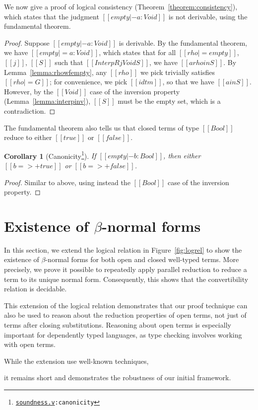 \documentclass[\ifpublic nolinenum\else\fi,online,OA]{jfp}
\newcommand{\scw}[1]{}
\newcommand{\jc}[1]{}
\newcommand{\dotv}[2]{\href{#1}{\texttt{#1}}{\texttt{:#2}}}
\newtheorem{corollary}[theorem]{Corollary}
\theoremstyle{definition}
\begin{document}
We now give a proof of logical consistency (Theorem~\ref{theorem:consistency}),
which states that the judgment $[[empty |- a : Void]]$ is not derivable,
using the fundamental theorem.

\begin{proof}
  Suppose $[[empty |- a : Void]]$ is derivable. By the
  fundamental theorem, we have $[[empty |= a : Void]]$, which states
  that for all $[[rho |= empty]]$, $[[j]]$, $[[S]]$ such
  that $[[InterpR j Void S]]$, we have $[[a {rho} in S]]$.
  By Lemma~\ref{lemma:rhowfempty}, any $[[rho]]$ we pick trivially
  satisfies $[[rho |= G]]$; for convenience, we pick $[[idtm]]$,
  so that we have $[[a in S]]$.
  However, by the $[[Void]]$ case of the inversion property
  (Lemma~\ref{lemma:interpinv}), $[[S]]$ must be the empty set,
  which is a contradiction.
\end{proof}

The fundamental theorem also tells us that closed terms of type 
$[[Bool]]$ reduce to either $[[true]]$ or $[[false]]$.

\begin{corollary}[Canonicity\footnote{\dotv{soundness.v}{canonicity}}]
If $[[empty |- b : Bool]]$, then either $[[b =>+ true]]$ or $[[b =>+ false]]$.
\end{corollary}
\begin{proof}
  Similar to above, using instead the $[[Bool]]$ case of the inversion property.
\end{proof}

\section{Existence of \texorpdfstring{$\beta$}{beta}-normal forms}
\label{sec:extension}

In this section, we extend the logical relation in Figure~\ref{fig:logrel}
to show the existence of $\beta$-normal forms for both open and closed
well-typed terms. More precisely, we prove it possible to repeatedly apply
parallel reduction to reduce a term to its unique normal form. Consequently,
this shows that the convertibility relation is decidable.

This extension of the logical relation demonstrates that our proof technique
can also be used to reason about the reduction properties of open terms, not
just of terms after closing substitutions. Reasoning about open terms is
especially important for dependently typed languages, as type checking involves
working with open terms.
\scw{
  Add when we can find a reference:
  However, even non dependently-typed languages employ such techniques,
  especially in the case of relational semantics.
}
While the extension use well-known techniques,
\jc{Does this need a citation?}
it remains short and demonstrates the robustness of our initial framework.
\end{document}

